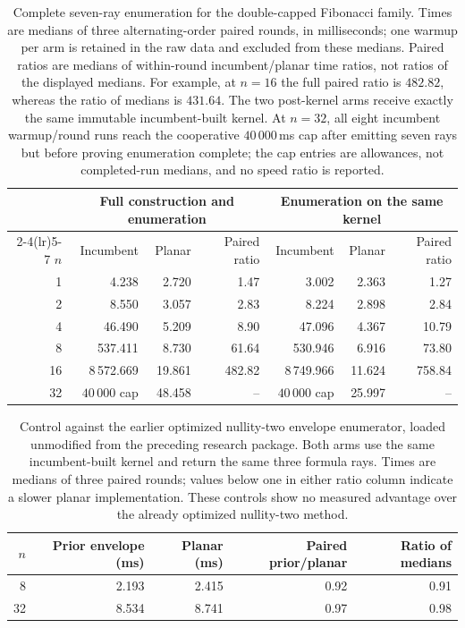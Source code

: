 \begin{table}[htbp]
\centering
\small
\setlength{\tabcolsep}{3.8pt}
\begin{tabular}{r rrr rrr}
\toprule
& \multicolumn{3}{c}{Full construction and enumeration}
& \multicolumn{3}{c}{Enumeration on the same kernel} \\
\cmidrule(lr){2-4}\cmidrule(lr){5-7}
$n$ & Incumbent & Planar & Paired ratio & Incumbent & Planar & Paired ratio \\
\midrule
1 & 4.238 & 2.720 & 1.47 & 3.002 & 2.363 & 1.27 \\
2 & 8.550 & 3.057 & 2.83 & 8.224 & 2.898 & 2.84 \\
4 & 46.490 & 5.209 & 8.90 & 47.096 & 4.367 & 10.79 \\
8 & 537.411 & 8.730 & 61.64 & 530.946 & 6.916 & 73.80 \\
16 & 8\,572.669 & 19.861 & 482.82 & 8\,749.966 & 11.624 & 758.84 \\
32 & $40\,000$ cap & 48.458 & -- & $40\,000$ cap & 25.997 & -- \\
\bottomrule
\end{tabular}
\caption{Complete seven-ray enumeration for the double-capped Fibonacci family.
Times are medians of three alternating-order paired rounds, in milliseconds;
one warmup per arm is retained in the raw data and excluded from these medians.
Paired ratios are medians of within-round incumbent/planar time ratios,
not ratios of the displayed medians. For example, at $n=16$ the full paired
ratio is $482.82$, whereas the ratio of medians is $431.64$.
The two post-kernel arms receive exactly the same immutable incumbent-built kernel.
At $n=32$, all eight incumbent warmup/round runs reach the cooperative
$40\,000$\,ms cap after emitting seven rays but before proving enumeration
complete; the cap entries are allowances, not completed-run medians,
and no speed ratio is reported.}
\label{tab:planar-enumeration-benchmarks}
\end{table}

\begin{table}[htbp]
\centering
\small
\begin{tabular}{r rrrr}
\toprule
$n$ & Prior envelope (ms) & Planar (ms) & Paired prior/planar & Ratio of medians \\
\midrule
8 & 2.193 & 2.415 & 0.92 & 0.91 \\
32 & 8.534 & 8.741 & 0.97 & 0.98 \\
\bottomrule
\end{tabular}
\caption{Control against the earlier optimized nullity-two envelope enumerator,
loaded unmodified from the preceding research package. Both arms use the same
incumbent-built kernel and return the same three formula rays. Times are
medians of three paired rounds; values below one in either ratio column
indicate a slower planar implementation. These controls show no measured
advantage over the already optimized nullity-two method.}
\label{tab:planar-prior-envelope-control}
\end{table}

